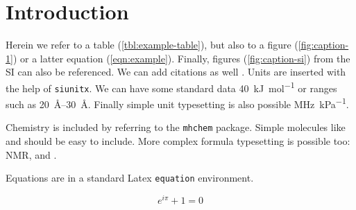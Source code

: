 

\section{Introduction}

Herein we refer to a table (\cref{tbl:example-table}), but also to a figure
(\cref{fig:caption-1}) or a latter equation (\cref{eqn:example}). Finally,
figures (\cref{fig:caption-si}) from the SI can also be referenced. We can add
citations as well \citep{example}. Units are inserted with the help of
\texttt{siunitx}. We can have some standard data \SI{40}{\kilo\joule\per\mol} or
ranges such as \SIrange{20}{30}{\angstrom}. Finally simple unit typesetting is
also possible \si{\mega\hertz\per\kilo\pascal}. 

Chemistry is included by referring to the \texttt{mhchem} package. Simple
molecules like  and  should be easy to include. More complex
formula typesetting is possible too:  NMR,  and
.

Equations are in a standard Latex \texttt{equation} environment.

\begin{equation}\label{eqn:example}
    e^{i\pi} + 1 = 0
\end{equation}

\lipsum[1-4]{}